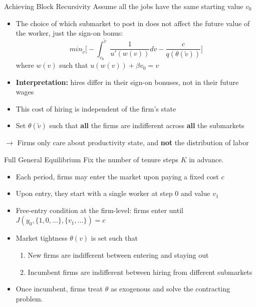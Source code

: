 \documentclass[9pt,aspectratio=169]{beamer} %
\begin{document}
\begin{frame}[noframenumbering]{Achieving Block Recursivity}
\hypertarget{Block Recur}{}
Assume all the jobs have the same starting value $v_0$
\begin{itemize}
    \item The choice of which submarket to post in does not affect the future value of the worker, just the sign-on bonus:
    \[min_{\tilde{v}}\Big[-\int_{v_0}^{\tilde{v}}\frac{1}{u'(w(v))}dv -\frac{c}{q(\theta(\tilde{v}))}\Big]\]
    where $w(v)$ such that $u(w(v))+\beta v_0=v$
    \item \textbf{Interpretation:} hires differ in their sign-on bonuses, not in their future wages
    \item This cost of hiring is independent of the firm's state
    \item Set $\theta(\tilde{v})$ such that \textbf{all} the firms are indifferent across \textbf{all} the submarkets
\end{itemize}
\vspace{5pt}
$\rightarrow$ Firms only care about productivity state, and \textbf{not} the distribution of labor
\hyperlink{PE}{} 

\end{frame}

\begin{frame}[noframenumbering]{Full General Equilibrium}
\hypertarget{GE}{}
Fix the number of tenure steps $K$ in advance.
\vspace{5pt}
\begin{itemize}
    \item Each period, firms may enter the market upon paying a fixed cost $c$
    \item Upon entry, they start with a single worker at step $0$ and value $v_1$
    \item Free-entry condition at the firm-level: firms enter until $J(y_0,\{1,0,...\},\{v_1,...\})=c$
    \item Market tightness $\theta(v)$ is set such that 
    \begin{enumerate}
        \item New firms are indifferent between entering and staying out
        \item Incumbent firms are indifferent between hiring from different submarkets
    \end{enumerate}
    \item Once incumbent, firms treat $\theta$ as exogenous and solve the contracting problem. \hyperlink{PE}{}

\end{itemize}
\end{frame}
\end{document}
